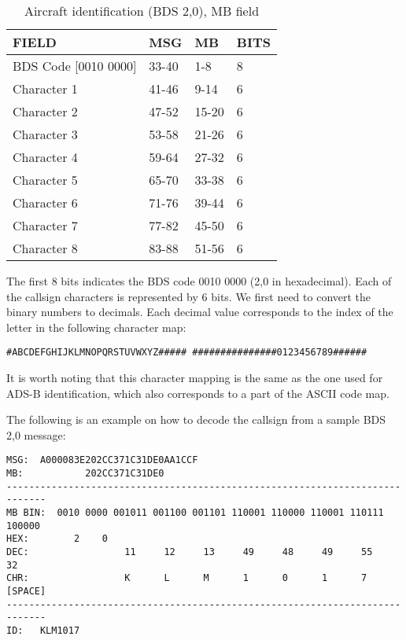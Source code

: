 \begin{table}[ht]
\centering
\caption{Aircraft identification (BDS 2,0), MB field}
\label{tb:bds30}
\begin{tabular}{|l|l|l|l|}
\hline
\textbf{FIELD} & \textbf{MSG} & \textbf{MB} & \textbf{BITS} \\ \hline
BDS Code {[}0010 0000{]} & 33-40 & 1-8 & 8 \\ \hline
Character 1 & 41-46 & 9-14 & 6 \\ \hline
Character 2 & 47-52 & 15-20 & 6 \\ \hline
Character 3 & 53-58 & 21-26 & 6 \\ \hline
Character 4 & 59-64 & 27-32 & 6 \\ \hline
Character 5 & 65-70 & 33-38 & 6 \\ \hline
Character 6 & 71-76 & 39-44 & 6 \\ \hline
Character 7 & 77-82 & 45-50 & 6 \\ \hline
Character 8 & 83-88 & 51-56 & 6 \\ \hline
\end{tabular}
\end{table}


The first 8 bits indicates the BDS code 0010 0000 (2,0 in hexadecimal). Each of the callsign characters is represented by 6 bits. We first need to convert the binary numbers to decimals. Each decimal value corresponds to the index of the letter in the following character map:

\begin{verbatim}
#ABCDEFGHIJKLMNOPQRSTUVWXYZ##### ###############0123456789######
\end{verbatim}

It is worth noting that this character mapping is the same as the one used for ADS-B identification, which also corresponds to a part of the ASCII code map.

The following is an example on how to decode the callsign from a sample BDS 2,0 message:

\begin{verbatim}
MSG:  A000083E202CC371C31DE0AA1CCF
MB:           202CC371C31DE0
-----------------------------------------------------------------------------
MB BIN:  0010 0000 001011 001100 001101 110001 110000 110001 110111 100000
HEX:        2    0
DEC:                 11     12     13     49     48     49     55     32
CHR:                 K      L      M      1      0      1      7     [SPACE]
-----------------------------------------------------------------------------
ID:   KLM1017
\end{verbatim}

